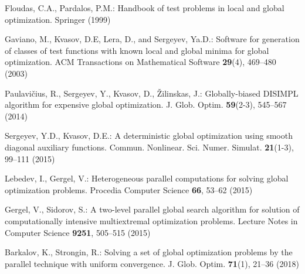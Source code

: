 \documentclass{llncs}
\begin{document}
\begin{thebibliography}{10}
Floudas, C.A., Pardalos, P.M.:  Handbook of test problems in local and global optimization. 
Springer (1999)  %

 Gaviano, M., Kvasov, D.E, Lera, D., and Sergeyev, Ya.D.: Software for 
generation of classes of test functions with known local and global minima for global 
optimization. ACM Transactions on Mathematical Software \textbf{29}(4), 469--480 (2003)

Paulavi\v{c}ius, R., Sergeyev, Y., Kvasov, D., \v{Z}ilinskas, J.: Globally-biased DISIMPL 
algorithm for expensive global optimization. J. Glob. Optim. \textbf{59}(2-3), 545--567 (2014)

Sergeyev, Y.D., Kvasov, D.E.: A deterministic global optimization using smooth diagonal 
auxiliary functions. Commun. Nonlinear. Sci. Numer. Simulat. \textbf{21}(1-3), 99--111 (2015)

Lebedev, I., Gergel, V.: Heterogeneous parallel computations for solving global optimization 
problems. Procedia Computer Science \textbf{66}, 53--62 (2015)

Gergel, V., Sidorov, S.: A two-level parallel global search algorithm for solution of 
computationally intensive multiextremal optimization problems. Lecture Notes in Computer 
Science  \textbf{9251}, 505--515 (2015)

Barkalov, K., Strongin, R.: Solving a set of global optimization problems by the parallel technique with uniform convergence. J. Glob. Optim. \textbf{71}(1), 21--36 (2018)


\end{thebibliography}
\end{document}

